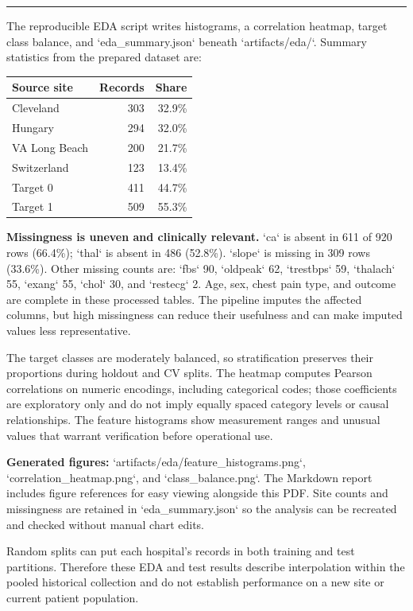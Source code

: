 \documentclass[10pt]{article}
\newcommand{\sectiontitle}[1]{\vspace*{0.15in}{\Large\bfseries\color{navy}#1}\par\vspace{0.08in}\hrule\vspace{0.16in}}
\newcommand{\callout}[1]{\noindent\colorbox{light}{\parbox{\dimexpr\linewidth-2\fboxsep}{#1}}}
\begin{document}
\newpage
\sectiontitle{2. Exploratory data analysis}
The reproducible EDA script writes histograms, a correlation heatmap, target class balance, and `eda_summary.json` beneath `artifacts/eda/`. Summary statistics from the prepared dataset are:

\begin{center}
\begin{tabular}{lrr}
\toprule
Source site & Records & Share \\
\midrule
Cleveland & 303 & 32.9\% \\
Hungary & 294 & 32.0\% \\
VA Long Beach & 200 & 21.7\% \\
Switzerland & 123 & 13.4\% \\
\midrule
Target 0 & 411 & 44.7\% \\
Target 1 & 509 & 55.3\% \\
\bottomrule
\end{tabular}
\end{center}

\textbf{Missingness is uneven and clinically relevant.} `ca` is absent in 611 of 920 rows (66.4\%); `thal` is absent in 486 (52.8\%). `slope` is missing in 309 rows (33.6\%). Other missing counts are: `fbs` 90, `oldpeak` 62, `trestbps` 59, `thalach` 55, `exang` 55, `chol` 30, and `restecg` 2. Age, sex, chest pain type, and outcome are complete in these processed tables. The pipeline imputes the affected columns, but high missingness can reduce their usefulness and can make imputed values less representative.

The target classes are moderately balanced, so stratification preserves their proportions during holdout and CV splits. The heatmap computes Pearson correlations on numeric encodings, including categorical codes; those coefficients are exploratory only and do not imply equally spaced category levels or causal relationships. The feature histograms show measurement ranges and unusual values that warrant verification before operational use.

\vspace{0.12in}
\textbf{Generated figures:} `artifacts/eda/feature_histograms.png`, `correlation_heatmap.png`, and `class_balance.png`. The Markdown report includes figure references for easy viewing alongside this PDF. Site counts and missingness are retained in `eda_summary.json` so the analysis can be recreated and checked without manual chart edits.

\callout{Random splits can put each hospital's records in both training and test partitions. Therefore these EDA and test results describe interpolation within the pooled historical collection and do not establish performance on a new site or current patient population.}
\end{document}
